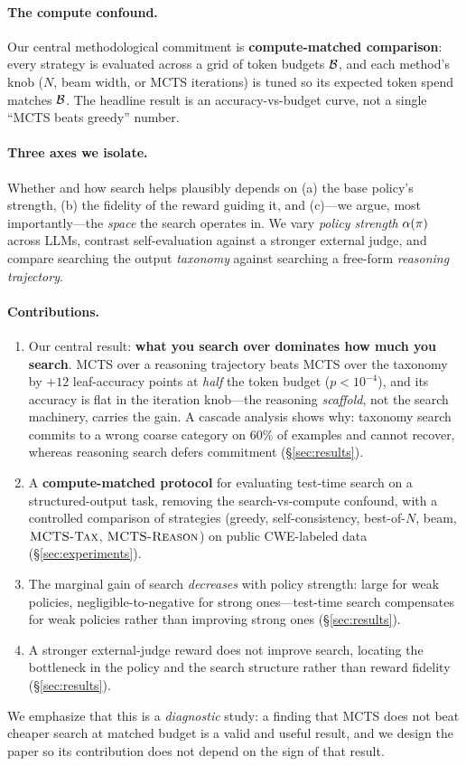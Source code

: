 \paragraph{The compute confound.}
Our central methodological commitment is \textbf{compute-matched comparison}: every
strategy is evaluated across a grid of token budgets $\mathcal{B}$, and each method's
knob ($N$, beam width, or MCTS iterations) is tuned so its expected token spend
matches $\mathcal{B}$. The headline result is an accuracy-vs-budget curve, not a single
``MCTS beats greedy'' number.

\paragraph{Three axes we isolate.}
Whether and how search helps plausibly depends on (a) the base policy's strength,
(b) the fidelity of the reward guiding it, and (c)---we argue, most
importantly---the \emph{space} the search operates in. We vary \emph{policy
strength} $\alpha(\pi)$ across LLMs, contrast self-evaluation against a stronger
external judge, and compare searching the output \emph{taxonomy} against searching
a free-form \emph{reasoning trajectory}.

\paragraph{Contributions.}
\begin{enumerate}
\item Our central result: \textbf{what you search over dominates how much you
search}. MCTS over a reasoning trajectory beats MCTS over the taxonomy by $+12$
leaf-accuracy points at \emph{half} the token budget ($p{<}10^{-4}$), and its
accuracy is flat in the iteration knob---the reasoning \emph{scaffold}, not the
search machinery, carries the gain. A cascade analysis shows why: taxonomy search
commits to a wrong coarse category on $60\%$ of examples and cannot recover,
whereas reasoning search defers commitment (\S\ref{sec:results}).
\item A \textbf{compute-matched protocol} for evaluating test-time search on a
structured-output task, removing the search-vs-compute confound, with a controlled
comparison of strategies (greedy, self-consistency, best-of-$N$, beam, $\textsc{MCTS-Tax}$,
$\textsc{MCTS-Reason}$) on public CWE-labeled data (\S\ref{sec:experiments}).
\item The marginal gain of search \emph{decreases} with policy strength: large for
weak policies, negligible-to-negative for strong ones---test-time search
compensates for weak policies rather than improving strong ones
(\S\ref{sec:results}).
\item A stronger external-judge reward does not improve search, locating the
bottleneck in the policy and the search structure rather than reward fidelity
(\S\ref{sec:results}).
\end{enumerate}

We emphasize that this is a \emph{diagnostic} study: a finding that MCTS does not
beat cheaper search at matched budget is a valid and useful result, and we design
the paper so its contribution does not depend on the sign of that result.
